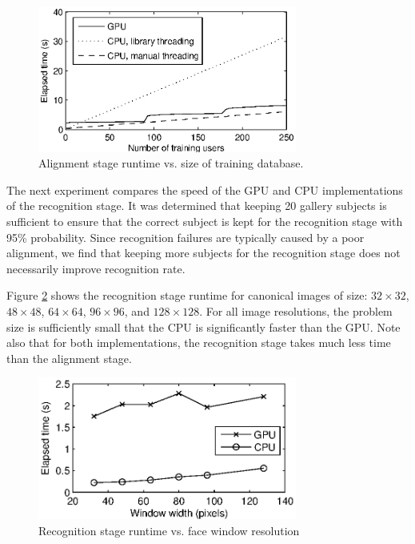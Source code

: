 \documentclass[preprint]{sigplanconf}
\begin{document}
\begin{figure}[t!]
\centering
\includegraphics[width=3.35in]{figures/alignment_runtime_graph}
\caption{Alignment stage runtime vs. size of training database.} 
\label{fig:alignment_stage_runtime}
\end{figure}

The next experiment compares the speed of the GPU and CPU implementations of
the recognition stage.  It was determined that keeping 20 gallery subjects is
sufficient to ensure that the correct subject is kept for the recognition stage
with 95\% probability.  Since recognition failures are typically caused by a
poor alignment, we find that keeping more subjects for the recognition stage does
not necessarily improve recognition rate.

Figure \ref{fig:recognition_stage_runtime} shows the recognition stage runtime
for canonical images of size: $32\times32$, $48 \times 48$, $64 \times 64$, $96 \times
96$, and $128 \times 128$.  For all image resolutions, the problem size
is sufficiently small that the CPU is significantly faster than the GPU.  Note
also that for both implementations, the recognition stage takes much less time
than the alignment stage.
\begin{figure}[t!]
\centering
\includegraphics[width=3.35in]{figures/speedVsResolution} 
\caption{Recognition stage runtime vs. face window resolution}
\label{fig:recognition_stage_runtime} \end{figure}
\end{document}
